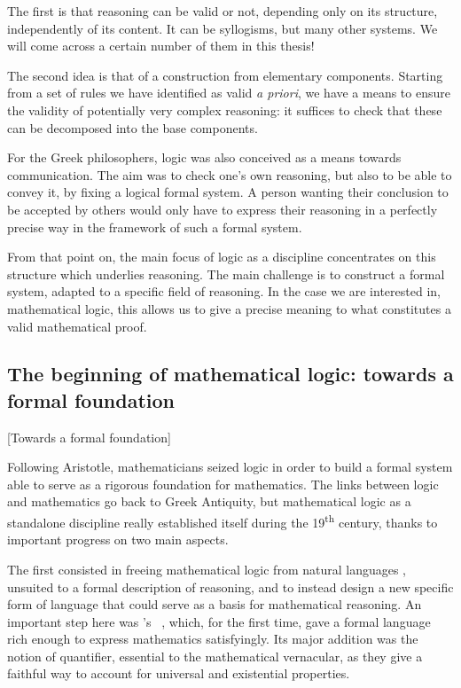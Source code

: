 The first is that reasoning can be valid or not, depending only on its structure,
independently of its content.
It can be syllogisms, but many other systems. We will come across a certain number of them
in this thesis!

The second idea is that of a construction from elementary components.
Starting from a set of rules
we have identified as valid \textit{a priori}, we have a means to ensure the validity
of potentially very complex reasoning: it suffices to check that these
can be decomposed into the base components.

For the Greek philosophers, logic was also conceived as a means towards communication.
The aim was to check one’s own reasoning, but also to be able to convey
it, by fixing a logical formal system.%
A person wanting their conclusion to be accepted by others would only have to express their
reasoning in a perfectly precise way in the framework of such a formal system.

From that point on, the main focus of logic as a discipline
concentrates on this structure which underlies reasoning.
The main challenge is to construct a formal system, adapted to a specific
field of reasoning. In the case we are interested in, mathematical logic, this
allows us to give a precise meaning to what constitutes a valid mathematical proof.


\subsection{The beginning of mathematical logic: towards a formal foundation}[Towards a formal foundation]

Following Aristotle, mathematicians seized logic in order to build a formal system
able to serve as a rigorous foundation for mathematics.
The links between logic and mathematics go back to Greek Antiquity, but
mathematical logic as a standalone discipline really established itself
during the 19\textsuperscript{th} century, thanks to important progress on two main aspects.

The first consisted in freeing mathematical logic from natural languages%
,
unsuited to a formal description of reasoning, and to instead design a new specific
form of language that could serve as a basis for mathematical reasoning.
An important step here was \citeauthor{Begriffsschrift}'s
~, which, for the first time,
gave a formal language rich enough to express mathematics satisfyingly. Its
major addition was the notion of quantifier, essential to the mathematical vernacular,
as they give a faithful way to account for universal%
and existential%
properties.

